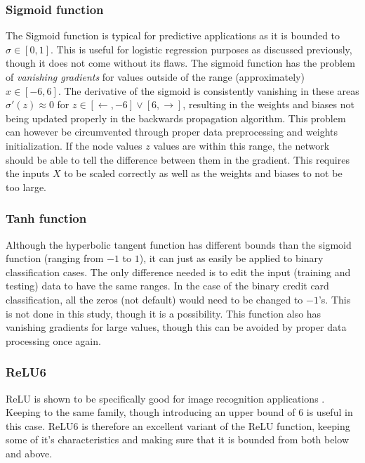         \subsubsection{Sigmoid function}     %
            The Sigmoid function is typical for predictive applications as it is bounded to $\sigma \in [0,1]$. This is useful for logistic regression purposes as discussed previously, though it does not come without its flaws. The sigmoid function has the problem of \textit{vanishing gradients} for values outside of the range (approximately) $x \in [-6,6]$. The derivative of the sigmoid is consistently vanishing in these areas $\sigma'(z)\approx 0$ for $z\in [\leftarrow, -6]\vee[6, \rightarrow]$, resulting in the weights and biases not being updated properly in the backwards propagation algorithm. This problem can however be circumvented through proper data preprocessing and weights initialization. If the node values $z$ values are within this range, the network should be able to tell the difference between them in the gradient. This requires the inputs $X$ to be scaled correctly as well as the weights and biases to not be too large.
        \subsubsection{Tanh function}
            Although the hyperbolic tangent function has different bounds than the sigmoid function (ranging from $-1$ to $1$), it can just as easily be applied to binary classification cases. The only difference needed is to edit the input (training and testing) data to have the same ranges. In the case of the binary credit card classification, all the zeros (not default) would need to be changed to $-1$'s. This is not done in this study, though it is a possibility. This function also has vanishing gradients for large values, though this can be avoided by proper data processing once again. 
        \subsubsection{ReLU6}        %
            ReLU is shown to be specifically good for image recognition applications \cite{ReLUImagenet}. Keeping to the same family, though introducing an upper bound of $6$ is useful in this case. ReLU6 is therefore an excellent variant of the ReLU function, keeping some of it's characteristics and making sure that it is bounded from both below and above.
        
